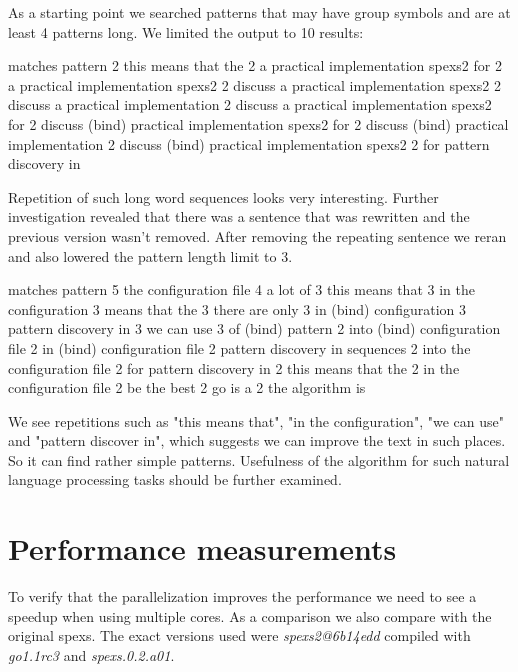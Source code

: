 As a starting point we searched patterns that may have group symbols and are at least 4 patterns long. We limited the output to 10 results:

\begin{file}
matches  pattern
2        this means that the
2        a practical implementation spexs2 for
2        a practical implementation spexs2
2        discuss a practical implementation spexs2
2        discuss a practical implementation
2        discuss a practical implementation spexs2 for
2        discuss (bind) practical implementation spexs2 for
2        discuss (bind) practical implementation
2        discuss (bind) practical implementation spexs2
2        for pattern discovery in
\end{file}

Repetition of such long word sequences looks very interesting. Further investigation revealed that there was a sentence that was rewritten and the previous version wasn't removed. After removing the repeating sentence we reran and also lowered the pattern length limit to 3.

\begin{file}
matches  pattern
5        the configuration file
4        a lot of
3        this means that
3        in the configuration
3        means that the
3        there are only
3        in (bind) configuration
3        pattern discovery in
3        we can use
3        of (bind) pattern
2        into (bind) configuration file
2        in (bind) configuration file
2        pattern discovery in sequences
2        into the configuration file
2        for pattern discovery in
2        this means that the
2        in the configuration file
2        be the best
2        go is a
2        the algorithm is
\end{file}

We see repetitions such as "this means that", "in the configuration", "we can use" and "pattern discover in", which suggests we can improve the text in such places. So it can find rather simple patterns. Usefulness of the algorithm for such natural language processing tasks should be further examined.

\section{Performance measurements}

To verify that the parallelization improves the performance we need to see a speedup when using multiple cores. As a comparison we also compare with the original spexs. The exact versions used were \emph{spexs2@6b14edd} compiled with \emph{go1.1rc3} and \emph{spexs.0.2.a01}.


